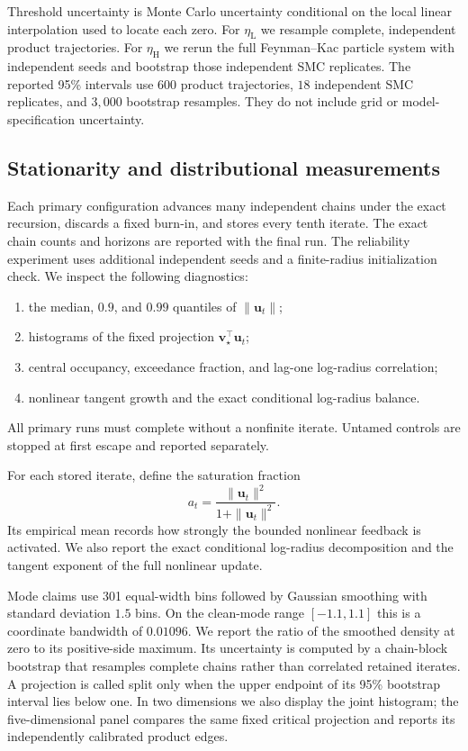 \documentclass[11pt]{article}
\theoremstyle{definition}
\newcommand{\uvec}{\mathbf u}
\newcommand{\vvec}{\mathbf v}
\begin{document}
Threshold uncertainty is Monte Carlo uncertainty conditional on the local
linear interpolation used to locate each zero.  For $\eta_{\mathrm L}$ we
resample complete, independent product trajectories.  For
$\eta_{\mathrm H}$ we rerun the full Feynman--Kac particle system with
independent seeds and bootstrap those independent SMC replicates.  The
reported 95\% intervals use $600$ product trajectories, $18$ independent SMC
replicates, and $3{,}000$ bootstrap resamples.  They do not include grid or
model-specification uncertainty.

\subsection{Stationarity and distributional measurements}

Each primary configuration advances many independent chains under the exact
recursion, discards a fixed burn-in, and stores every tenth iterate.  The
exact chain counts and horizons are reported with the final run.  The
reliability experiment uses additional independent seeds and a
finite-radius initialization check.  We inspect the following diagnostics:
\begin{enumerate}[leftmargin=2em]
  \item the median, $0.9$, and $0.99$ quantiles of $\|\uvec_t\|$;
  \item histograms of the fixed projection $\vvec_\star^\top\uvec_t$;
  \item central occupancy, exceedance fraction, and lag-one log-radius
  correlation;
  \item nonlinear tangent growth and the exact conditional log-radius
  balance.
\end{enumerate}
All primary runs must complete without a nonfinite iterate.  Untamed controls
are stopped at first escape and reported separately.

For each stored iterate, define the saturation fraction
\begin{equation}
  a_t=\frac{\|\uvec_t\|^2}{1+\|\uvec_t\|^2}.
  \label{eq:activation-ratio}
\end{equation}
Its empirical mean records how strongly the bounded nonlinear feedback is
activated.  We also report the exact conditional log-radius decomposition
and the tangent exponent of the full nonlinear update.

Mode claims use 301 equal-width bins followed by Gaussian smoothing with
standard deviation $1.5$ bins.  On the clean-mode range $[-1.1,1.1]$ this is
a coordinate bandwidth of $0.01096$.  We report the ratio of the smoothed
density at zero to its positive-side maximum.  Its uncertainty is computed by
a chain-block bootstrap that resamples complete chains rather than correlated
retained iterates.  A projection is called split only when the upper endpoint
of its 95\% bootstrap interval lies below one.  In two dimensions we also
  display the joint histogram; the five-dimensional panel compares the same
  fixed critical projection and reports its independently calibrated product
  edges.
\end{document}
